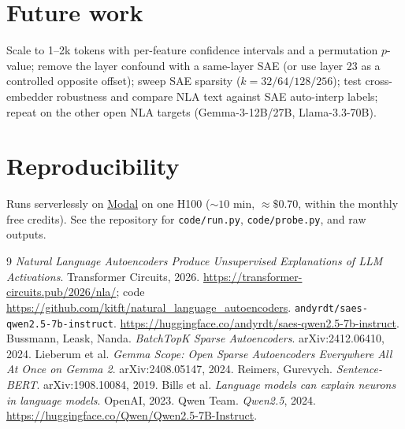 \documentclass[11pt]{article}
\begin{document}
\section{Future work}
Scale to 1--2k tokens with per-feature confidence intervals and a permutation
$p$-value; remove the layer confound with a same-layer SAE (or use layer 23 as a
controlled opposite offset); sweep SAE sparsity ($k=32/64/128/256$); test
cross-embedder robustness and compare NLA text against SAE auto-interp labels;
repeat on the other open NLA targets (Gemma-3-12B/27B, Llama-3.3-70B).

\section*{Reproducibility}
Runs serverlessly on \href{https://modal.com}{Modal} on one H100
(${\sim}10$ min, ${\approx}\$0.70$, within the monthly free credits). See the
repository for \texttt{code/run.py}, \texttt{code/probe.py}, and raw outputs.

\begin{thebibliography}{9}
 \emph{Natural Language Autoencoders Produce Unsupervised
Explanations of LLM Activations}. Transformer Circuits, 2026.
\url{https://transformer-circuits.pub/2026/nla/};
code \url{https://github.com/kitft/natural_language_autoencoders}.
 \texttt{andyrdt/saes-qwen2.5-7b-instruct}.
\url{https://huggingface.co/andyrdt/saes-qwen2.5-7b-instruct}.
 Bussmann, Leask, Nanda. \emph{BatchTopK Sparse
Autoencoders}. arXiv:2412.06410, 2024.
 Lieberum et al. \emph{Gemma Scope: Open Sparse Autoencoders
Everywhere All At Once on Gemma 2}. arXiv:2408.05147, 2024.
 Reimers, Gurevych. \emph{Sentence-BERT}. arXiv:1908.10084, 2019.
 Bills et al. \emph{Language models can explain neurons in
language models}. OpenAI, 2023.
 Qwen Team. \emph{Qwen2.5}, 2024.
\url{https://huggingface.co/Qwen/Qwen2.5-7B-Instruct}.
\end{thebibliography}
\end{document}
